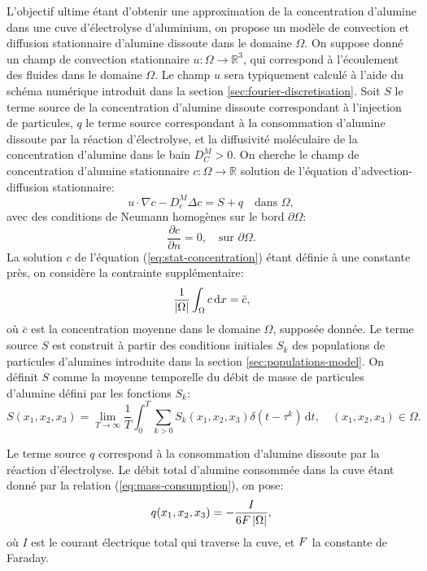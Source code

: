L'objectif ultime étant d'obtenir une approximation de la
concentration d'alumine dans une cuve d'électrolyse d'aluminium, on
propose un modèle de convection et diffusion stationnaire d'alumine
dissoute dans le domaine $\Omega$.  On suppose donné un champ de
convection stationnaire $u:\Omega\to\mathbb R^3$, qui correspond à
l'écoulement des fluides dans le domaine $\Omega$. Le champ $u$ sera
typiquement calculé à l'aide du schéma numérique introduit dans la
section \ref{sec:fourier-discretisation}.  Soit $S$ le terme source de
la concentration d'alumine dissoute correspondant à l'injection de
particules, $q$ le terme source correspondant à la consommation
d'alumine dissoute par la réaction d'électrolyse, et la diffusivité
moléculaire de la concentration d'alumine dans le bain $D_C^M > 0$.
On cherche le champ de concentration d'alumine stationnaire
$c:\Omega\to\mathbb R$ solution de l'équation d'advection-diffusion
stationnaire:
\begin{equation}\label{eq:stat-concentration}
  u\cdot \nabla c - D_c^M \Delta c = S + q\quad \text{dans } \Omega,
\end{equation}
avec des conditions de Neumann homogènes sur le bord $\partial
\Omega$:
\begin{equation}
  \frac{\partial c}{\partial n} = 0,\quad\text{sur } \partial \Omega.
\end{equation}
La solution $c$ de l'équation (\ref{eq:stat-concentration}) étant
définie à une constante près, on considère la contrainte
supplémentaire:
\begin{equation}\label{eq:stat-alumina-avg-c}
  \frac{1}{\left\lvert \Omega \right\rvert}\int_\Omega c\,\mathrm dx = \bar c,
\end{equation}
où $\bar c$ est la concentration moyenne dans le domaine $\Omega$,
supposée donnée.
Le terme source $S$ est construit à partir des conditions initiales
$S_k$ des populations de particules d'alumines introduite dans la
section \ref{sec:populations-model}. On définit $S$ comme la moyenne
temporelle du débit de masse de particules d'alumine défini par
les fonctions $S_k$:
\begin{equation}
  S(x_1,x_2,x_3) = \lim_{T\to\infty}\frac{1}{T}\int_0^T \sum_{k>0}
  S_k(x_1, x_2, x_3) \delta(t - \tau^k)\,\mathrm dt, \quad (x_1, x_2, x_3)\in\Omega.
\end{equation}

Le terme source $q$ correspond à la consommation d'alumine
dissoute par la réaction d'électrolyse. Le débit total d'alumine
consommée dans la cuve étant donné par la relation
(\ref{eq:mass-consumption}), on pose:
\begin{equation}\label{eq:stat-alumina-consommation}
  q(x_1, x_2, x_3) = -\frac{I}{6F\left\lvert \Omega \right\rvert},
\end{equation}
où $I$ est le courant électrique total qui traverse la cuve, et
$F$ la constante de Faraday.

